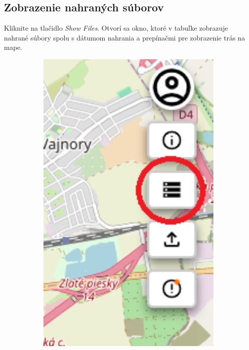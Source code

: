 \subsection{Zobrazenie nahraných súborov\label{section:how_to_open_uploaded_files}}
Kliknite na tlačidlo \textit{Show Files}. Otvorí sa okno, ktoré v tabuľke zobrazuje nahrané súbory spolu s dátumom nahrania a prepínačmi pre zobrazenie trás na mape.
\begin{figure}[H]
    \centering
    \begin{subfigure}{0.2\textwidth}
        \centering
        \includegraphics[width=1\textwidth]{guide_includes/img/show_files_tool_button.png}

\end{subfigure}
\end{figure}
